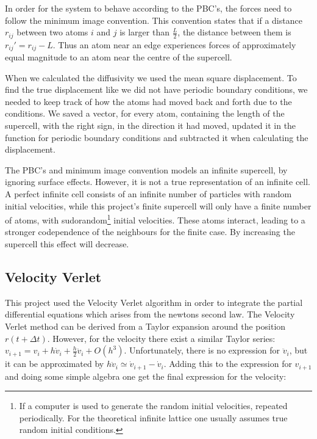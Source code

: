 In order for the system to behave according to the PBC's, the forces need to follow the minimum image convention. This convention states that if a distance $ r_{ij} $ between two atoms $ i $ and $ j $ is larger than $ \frac{L}{2} $, the distance between them is $  r_{ij}'  = r_{ij}-L$. Thus an atom  near an edge experiences forces of approximately equal magnitude to an atom near the centre of the supercell. 


When we calculated the diffusivity we used the mean square displacement. To find the true displacement like we did not have periodic boundary conditions, we needed to keep track of how the atoms had moved back and forth due to the conditions. We saved a vector, for every atom, containing the length of the supercell, with the right sign, in the direction it had moved, updated it in the function for periodic boundary conditions and subtracted it when calculating the displacement. 

The PBC's and minimum image convention models an infinite supercell, by ignoring surface effects. However, it is not a true representation of an infinite cell. A perfect infinite cell consists of an infinite number of particles with random initial velocities, while this project's finite supercell will only have a finite number of atoms, with sudorandom\footnote{If a computer is used to generate the random initial velocities, repeated periodically. For the theoretical infinite lattice one usually assumes true random initial conditions.} initial velocities. These atoms interact, leading to a stronger codependence of the neighbours for the finite case. By increasing the supercell this effect will decrease.   	



\subsection{Velocity Verlet}

This project used the Velocity Verlet algorithm in order to integrate the partial differential equations which arises from the newtons second law. 	The Velocity Verlet method can be derived from a Taylor expansion around the position $ r(t+\Delta t) $. However, for the velocity there exist a similar Taylor series: $  v_{i+1} = v_i + h\dot{v}_i + \frac{h}{2} \ddot{v}_i + O(h^3)$. Unfortunately, there is no expression for $ \ddot{v}_i $, but it can be approximated by $ h\ddot{v}_i \simeq \dot{v}_{i+1}-\dot{v}_i$. Adding this to the expression for $ v_{i+1} $ and doing some simple algebra one get the final expression for the velocity:

